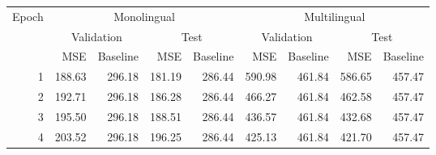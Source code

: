 \begin{tabular}{r|rr|rr|rr|rr}
     \hline
     \multirow{3}{*}{Epoch} & \multicolumn{4}{c|}{Monolingual} & \multicolumn{4}{c}{Multilingual} \\
     \cline{2-9}
     & \multicolumn{2}{c|}{Validation} & \multicolumn{2}{c|}{Test} & \multicolumn{2}{c|}{Validation} & \multicolumn{2}{c}{Test} \\
     \cline{2-9}
     & MSE & Baseline & MSE & Baseline & MSE & Baseline & MSE & Baseline \\
     \hline
     1 & 188.63 & 296.18 & 181.19 & 286.44 & 590.98 & 461.84 & 586.65 & 457.47 \\
     2 & 192.71 & 296.18 & 186.28 & 286.44 & 466.27 & 461.84 & 462.58 & 457.47 \\
     3 & 195.50 & 296.18 & 188.51 & 286.44 & 436.57 & 461.84 & 432.68 & 457.47 \\
     4 & 203.52 & 296.18 & 196.25 & 286.44 & 425.13 & 461.84 & 421.70 & 457.47 \\
     \hline
\end{tabular}